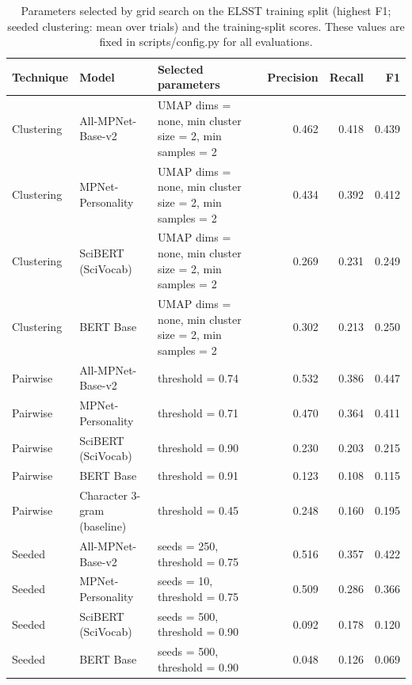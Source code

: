 \begin{table}[ht]
\centering
\small
\caption{Parameters selected by grid search on the ELSST training split (highest F1; seeded clustering: mean over trials) and the training-split scores. These values are fixed in scripts/config.py for all evaluations.}
\label{tab:S2_calibration}
\begin{tabular}{lllrrr}
\toprule
Technique & Model & Selected parameters & Precision & Recall & F1 \\
\midrule
Clustering & All-MPNet-Base-v2 & UMAP dims = none, min cluster size = 2, min samples = 2 & 0.462 & 0.418 & 0.439 \\
Clustering & MPNet-Personality & UMAP dims = none, min cluster size = 2, min samples = 2 & 0.434 & 0.392 & 0.412 \\
Clustering & SciBERT (SciVocab) & UMAP dims = none, min cluster size = 2, min samples = 2 & 0.269 & 0.231 & 0.249 \\
Clustering & BERT Base & UMAP dims = none, min cluster size = 2, min samples = 2 & 0.302 & 0.213 & 0.250 \\
Pairwise & All-MPNet-Base-v2 & threshold = 0.74 & 0.532 & 0.386 & 0.447 \\
Pairwise & MPNet-Personality & threshold = 0.71 & 0.470 & 0.364 & 0.411 \\
Pairwise & SciBERT (SciVocab) & threshold = 0.90 & 0.230 & 0.203 & 0.215 \\
Pairwise & BERT Base & threshold = 0.91 & 0.123 & 0.108 & 0.115 \\
Pairwise & Character 3-gram (baseline) & threshold = 0.45 & 0.248 & 0.160 & 0.195 \\
Seeded & All-MPNet-Base-v2 & seeds = 250, threshold = 0.75 & 0.516 & 0.357 & 0.422 \\
Seeded & MPNet-Personality & seeds = 10, threshold = 0.75 & 0.509 & 0.286 & 0.366 \\
Seeded & SciBERT (SciVocab) & seeds = 500, threshold = 0.90 & 0.092 & 0.178 & 0.120 \\
Seeded & BERT Base & seeds = 500, threshold = 0.90 & 0.048 & 0.126 & 0.069 \\
\bottomrule
\end{tabular}
\end{table}
